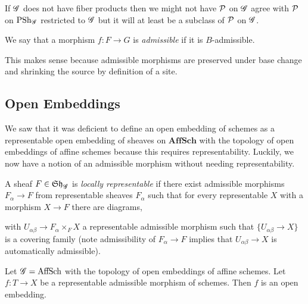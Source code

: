 \documentclass[12pt]{article}
\begin{document}
\begin{rmk}
If $\mathscr{G}$ does not have fiber products then we might not have $\mathcal{P}$ on $\mathscr{G}$ agree with $\mathcal{P}$ on $\mathrm{PSh}_{\mathscr{G}}$ restricted to $\mathscr{G}$ but it will at least be a subclass of $\mathcal{P}$ on $\mathscr{G}$.
\end{rmk}

\begin{defn}
We say that a morphism $f : F \to G$ is \textit{admissible} if it is $B$-admissible.
\end{defn}

\begin{rmk}
This makes sense because admissible morphisms are preserved under base change and shrinking the source by definition of a site.
\end{rmk}

\subsection{Open Embeddings}

We saw that it was deficient to define an open embedding of schemes as a representable open embedding of sheaves on $\mathbf{AffSch}$ with the topology of open embeddings of affine schemes because this requires representability. Luckily, we now have a notion of an admissible morphism without needing representability. 

\begin{defn}
A sheaf $F \in \mathfrak{Sh}_{\mathscr{G}}$ is \textit{locally representable} if there exist admissible morphisms $F_\alpha \to F$ from representable sheaves $F_\alpha$ such that for every representable $X$ with a morphism $X \to F$ there are diagrams,
\begin{center}
\end{center}
with $U_{\alpha \beta} \to F_\alpha \times_F X$ a representable admissible morphism such that $\{ U_{\alpha \beta} \to X \}$ is a covering family (note admissibility of $F_\alpha \to F$ implies that $U_{\alpha \beta} \to X$ is automatically admissible).
\end{defn}


\begin{lemma}
Let $\mathscr{G} = \mathrm{AffSch}$ with the topology of open embeddings of affine schemes. Let $f : T \to X$ be a representable admissible morphism of schemes. Then $f$ is an open embedding.
\end{lemma}
\end{document}
